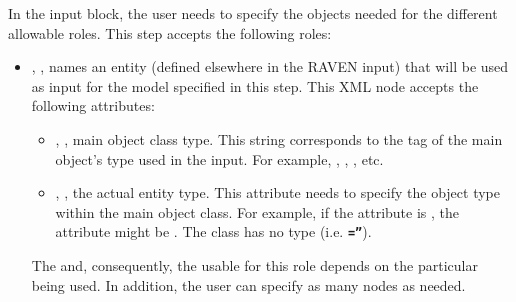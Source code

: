 In the  input block, the user needs to specify the objects
needed for the different allowable roles.
%
This step accepts the following roles:
\begin{itemize}
\item {}, , names an entity
(defined elsewhere in the RAVEN input) that will be used as input for the model
specified in this step.
This XML node accepts the following attributes:
\begin{itemize}
  \item {}, , main object class
    type.
    This string corresponds to the tag of the main object's type used in the
    input.
    For example, , , ,
    etc.
  \item {}, , the actual entity
    type.
    This attribute needs to specify the object type within the main object
    class.
    For example, if the   attribute is , the
     attribute might be .
    \nb The class  has no type (i.e.
    \textbf{\texttt{=''}}).
\end{itemize}

\nb The  and, consequently, the  usable for this
role depends on the particular  being used.
%
In addition, the user can specify as many  nodes as needed.


\end{itemize}
